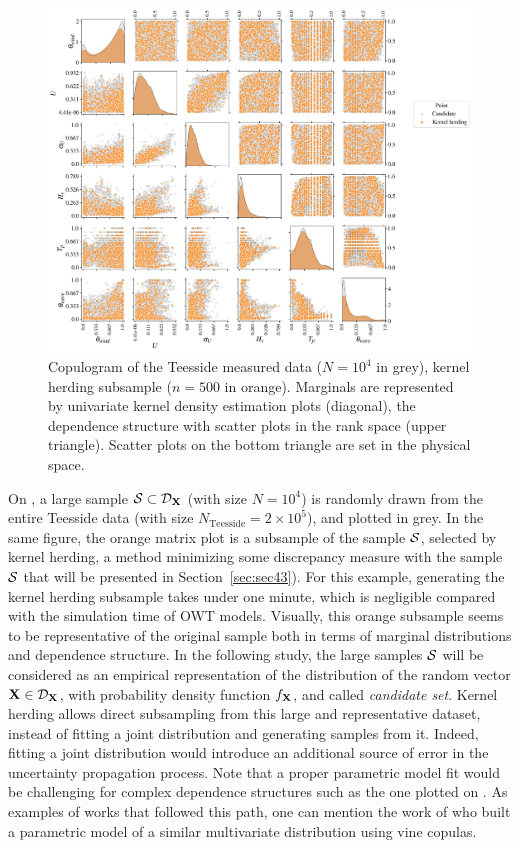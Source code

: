 \begin{figure}[!h]
    \begin{center}
        \includegraphics[width=\linewidth]{part2/figures/DCE/teesside/pairplot_kh.jpg}    
    \end{center}
    \caption{Copulogram of the Teesside measured data ($N=10^4$ in grey), kernel herding subsample ($n=500$ in orange). 
    Marginals are represented by univariate kernel density estimation plots (diagonal), the dependence structure with scatter plots in the rank space (upper triangle). 
    Scatter plots on the bottom triangle are set in the physical space.}
    \label{fig:envi_pairplot}
\end{figure}

On , a large sample $\mathcal{S} \subset \mathcal{D}_{{\bf X}}$ (with size $N=10^4$) is randomly drawn from the entire Teesside data (with size $N_{\mathrm{Teesside}} = 2\times 10^5$), and plotted in grey. 
In the same figure, the orange matrix plot is a subsample of the sample $\mathcal{S}$, selected by kernel herding, a method minimizing some discrepancy measure with the sample $\mathcal{S}$ that will be presented in Section~\ref{sec:sec43}). 
For this example, generating the kernel herding subsample takes under one minute, which is negligible compared with the simulation time of OWT models. 
Visually, this orange subsample seems to be representative of the original sample both in terms of marginal distributions and dependence structure. 
In the following study, the large samples $\mathcal{S}$ will be considered as an empirical representation of the distribution of the random vector ${\bf X} \in \mathcal{D}_{{\bf X}}$, with probability density function $f_{{\bf X}}$, and called \textit{candidate set}. 
Kernel herding allows direct subsampling from this large and representative dataset, instead of fitting a joint distribution and generating samples from it.
Indeed, fitting a joint distribution would introduce an additional source of error in the uncertainty propagation process.
Note that a proper parametric model fit would be challenging for complex dependence structures such as the one plotted on . 
As examples of works that followed this path, one can mention the work of \citet{li_zhan_2020} who built a parametric model of a similar multivariate distribution using vine copulas. 


